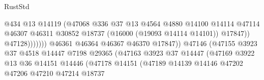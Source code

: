 \begin{lexlean}{RustStd}
\begin{coremodule}
                                                    @434
                                                    @13
                                                    @14119
                                                    (@47068
                                                      @336
                                                      @37
                                                      @13
                                                      @4564
                                                      @4880
                                                      @14100
                                                      @14114
                                                      @47114
                                                      @46307
                                                      @46311
                                                      @30852
                                                      @18737
                                                      (@16000 (@19093 @14114 @14101))
                                                      @17847))
                                                  @47128)))))))
                                    @46361
                                    @46364
                                    @46367
                                    @46370
                                    @17847))
                                @47146
                                (@47155
                                  @3923
                                  @37
                                  @4518
                                  @14447
                                  @7198
                                  @29365
                                  (@47163
                                    @3923
                                    @37
                                    @14447
                                    (@47169
                                      @3922
                                      @13
                                      @36
                                      @14151
                                      @14446
                                      (@47178
                                        @14151
                                        (@47189
                                          @14139
                                          @14146
                                          @47202
                                          @47206
                                          @47210
                                          @47214
                                          @18737

\end{coremodule}
\end{lexlean}
